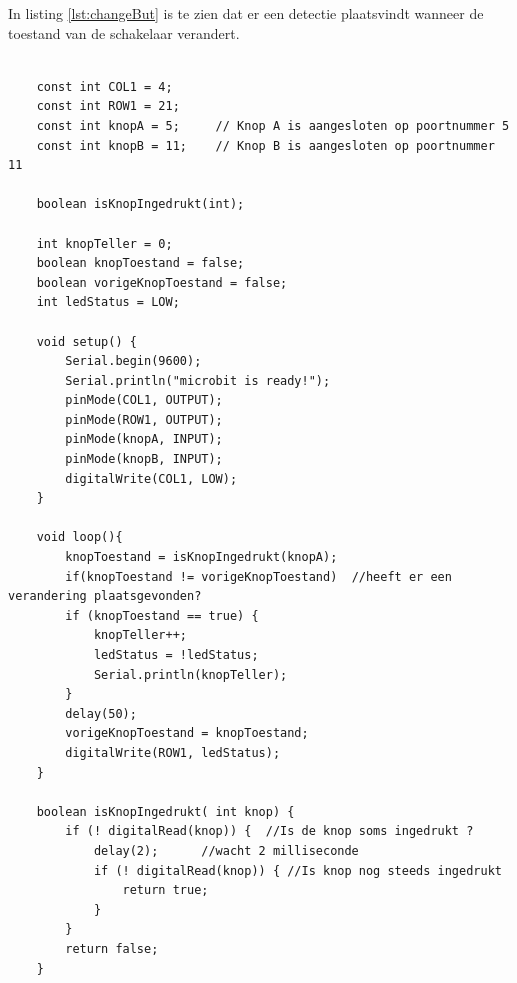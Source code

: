 In listing \ref{lst:changeBut} is te zien dat er een detectie plaatsvindt wanneer de toestand van de schakelaar verandert.
\begin{lstlisting}[caption= Een toestandverandering van de schakelaar.,label={lst:changeBut}]
	
	const int COL1 = 4; 
	const int ROW1 = 21;
	const int knopA = 5;     // Knop A is aangesloten op poortnummer 5
	const int knopB = 11;    // Knop B is aangesloten op poortnummer 11
	
	boolean isKnopIngedrukt(int);
	
	int knopTeller = 0;  
	boolean knopToestand = false;
	boolean vorigeKnopToestand = false;
	int ledStatus = LOW;
	
	void setup() {  
		Serial.begin(9600);
		Serial.println("microbit is ready!");
		pinMode(COL1, OUTPUT);
		pinMode(ROW1, OUTPUT);
		pinMode(knopA, INPUT);  
		pinMode(knopB, INPUT);   
		digitalWrite(COL1, LOW);
	}
	
	void loop(){
		knopToestand = isKnopIngedrukt(knopA);
		if(knopToestand != vorigeKnopToestand)  //heeft er een verandering plaatsgevonden?
		if (knopToestand == true) {
			knopTeller++;
			ledStatus = !ledStatus;
			Serial.println(knopTeller);
		}
		delay(50);
		vorigeKnopToestand = knopToestand;
		digitalWrite(ROW1, ledStatus);
	}
	
	boolean isKnopIngedrukt( int knop) {
		if (! digitalRead(knop)) {  //Is de knop soms ingedrukt ?
			delay(2);      //wacht 2 milliseconde 
			if (! digitalRead(knop)) { //Is knop nog steeds ingedrukt
				return true;
			}
		}
		return false;
	}
	
\end{lstlisting}

